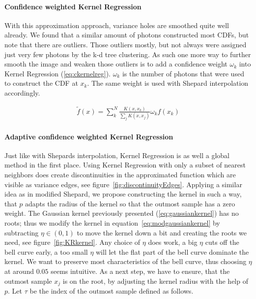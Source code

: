 \paragraph{Confidence weighted Kernel Regression}
\label{ch:ckernelreg}
With this approximation approach, variance holes are smoothed quite well already. We found that a similar amount of photons constructed most CDFs, but note that there are outliers. Those outliers mostly, but not always were assigned just very few photons by the k-d tree clustering. As such one more way to further smooth the image and weaken those outliers is to add a confidence weight $\omega_k$ into Kernel Regression (\ref{eq:ckernelreg}). $\omega_k$ is the number of photons that were used to construct the CDF at $x_k$. The same weight is used with Shepard interpolation accordingly.

\begin{align}\label{eq:ckernelreg}
\widetilde{f}(x) = \sum_{k}^{N}\frac{K(x,x_k)}{\sum\nolimits_{j}K(x, x_j)}\omega_kf(x_k)
\end{align}

\paragraph{Adaptive confidence weighted Kernel Regression}
Just like with Shepards interpolation, Kernel Regression is as well a global method in the first place. Using Kernel Regression with only a subset of nearest neighbors does create discontinuities in the approximated function which are visible as variance edges, see figure~\ref{fig:discontinuityEdges}. Applying a similar idea as in modified Shepard, we propose constructing the kernel in such a way, that $p$ adapts the radius of the kernel so that the outmost sample has a zero weight. The Gaussian kernel previously presented (\ref{eq:gaussiankernel}) has no roots; thus we modify the kernel in equation~\ref{eq:modgaussiankernel} by subtracting $\eta \in (0,1)$ to move the kernel down a bit and creating the roots we need, see figure~\ref{fig:KRkernel}. Any choice of $\eta$ does work, a big $\eta$ cuts off the bell curve early, a too small $\eta$ will let the flat part of the bell curve dominate the kernel. We want to preserve most characteristics of the bell curve, thus choosing $\eta$ at around $0.05$ seems intuitive.  As a next step, we have to ensure, that the outmost sample $x_j$ is on the root, by adjusting the kernel radius with the help of $p$. Let $\tau$ be the index of the outmost sample defined as follows. 

